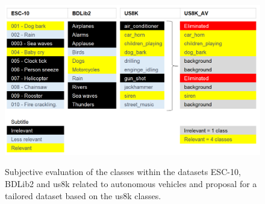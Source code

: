 \begin{figure}[htbp]
    \raggedright
        \caption{Subjective evaluation of the classes within the datasets ESC-10, BDLib2 and \gls{us8k} related to autonomous vehicles and proposal for a tailored dataset based on the \gls{us8k} classes.}
        \includegraphics[width=1\textwidth]{resources/images/050-methods/Methods_dataset_US8K_AV.png}
        \label{fig:methods_dataset_US8K_AV}
\end{figure}

